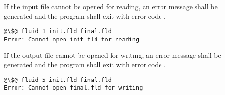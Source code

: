 If the input file cannot be opened for reading, an error message shall be
generated and the program shall exit with error code .

\begin{lstlisting}[style=terminal,escapechar=@]
@\$@ fluid 1 init.fld final.fld
Error: Cannot open init.fld for reading
\end{lstlisting}

If the output file cannot be opened for writing, an error message shall be
generated and the program shall exit with error code .

\begin{lstlisting}[style=terminal,escapechar=@]
@\$@ fluid 5 init.fld final.fld
Error: Cannot open final.fld for writing
\end{lstlisting}
